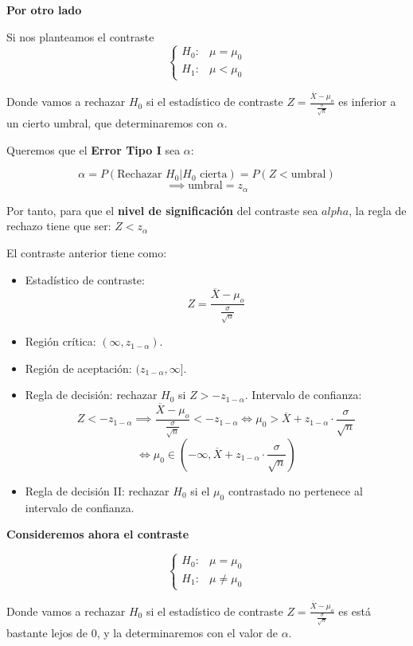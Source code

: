 \documentclass[
]{article}
\providecommand{\tightlist}{%
  \setlength{\itemsep}{0pt}\setlength{\parskip}{0pt}}
\begin{document}
\textbf{Por otro lado}

Si nos planteamos el contraste \[
\begin{cases}
H_0 : & \mu = \mu_0\\
H_1 : & \mu < \mu_0
\end{cases}
\]

Donde vamos a rechazar \(H_0\) si el estadístico de contraste
\(Z = \frac{\overline{X}-\mu_o}{\frac{\sigma}{\sqrt{n}}}\) es inferior a
un cierto umbral, que determinaremos con \(\alpha\).

Queremos que el \textbf{Error Tipo I} sea \(\alpha\):

\[\alpha = P(\text{Rechazar }H_0|H_0\text{ cierta}) = P(Z < \text{umbral})\]
\[\implies \text{umbral} = z_{\alpha}\]

Por tanto, para que el \textbf{nivel de significación} del contraste sea
\(alpha\), la regla de rechazo tiene que ser: \(Z < z_{\alpha}\)

El contraste anterior tiene como:

\begin{itemize}
\tightlist
\item
  Estadístico de contraste:
  \[Z = \frac{\overline{X}-\mu_o}{\frac{\sigma}{\sqrt{n}}}\]
\item
  Región crítica: \((\infty,z_{1-\alpha})\).
\item
  Región de aceptación: \((z_{1-\alpha}, \infty]\).
\item
  Regla de decisión: rechazar \(H_0\) si \(Z > -z_{1-\alpha}\).
  Intervalo de confianza:
  \[Z < -z_{1-\alpha} \implies \frac{\overline{X}-\mu_o}{\frac{\sigma}{\sqrt{n}}} < -z_{1-\alpha} \Leftrightarrow \mu_0 > \overline{X}+z_{1-\alpha} \cdot \frac{\sigma}{\sqrt{n}}\]
  \[\Leftrightarrow \mu_0 \in (-\infty, \overline{X}+z_{1-\alpha} \cdot \frac{\sigma}{\sqrt{n}})\]
\item
  Regla de decisión II: rechazar \(H_0\) si el \(\mu_0\) contrastado no
  pertenece al intervalo de confianza.
\end{itemize}

\textbf{Consideremos ahora el contraste}

\[
\begin{cases}
H_0 : & \mu = \mu_0\\
H_1 : & \mu \neq \mu_0
\end{cases}
\]

Donde vamos a rechazar \(H_0\) si el estadístico de contraste
\(Z = \frac{\overline{X}-\mu_o}{\frac{\sigma}{\sqrt{n}}}\) es está
bastante lejos de 0, y la determinaremos con el valor de \(\alpha\).
\end{document}
